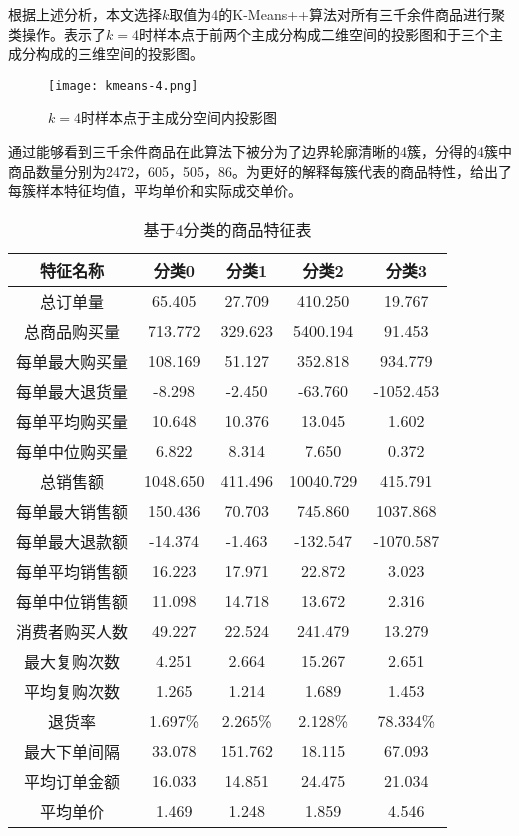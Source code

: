 \documentclass[lang=cn,11pt,a4paper,cite=authoryear]{elegantpaper}
\begin{document}
根据上述分析，本文选择$k$取值为4的K-Means++算法对所有三千余件商品进行聚类操作。表示了$k=4$时样本点于前两个主成分构成二维空间的投影图和于三个主成分构成的三维空间的投影图。
\begin{figure}[H]
  \centering
  \texttt{[image: kmeans-4.png]}
  \caption{$k=4$时样本点于主成分空间内投影图}
  \label{4聚类二维三维图}
\end{figure}

通过能够看到三千余件商品在此算法下被分为了边界轮廓清晰的4簇，分得的4簇中商品数量分别为2472，605，505，86。为更好的解释每簇代表的商品特性，给出了每簇样本特征均值，平均单价和实际成交单价。
\begin{center}
\begin{longtable}{ccccc}
  \caption{基于4分类的商品特征表}
  \label{基于4分类的商品特征表}\\
    \hline
    \textbf{特征名称} & \textbf{分类0} & \textbf{分类1} & \textbf{分类2} & \textbf{分类3}\\
    \hline
    总订单量 & 65.405 & 27.709 & 410.250 & 19.767\\
    总商品购买量 & 713.772 & 329.623 & 5400.194 & 91.453\\
    每单最大购买量 & 108.169 & 51.127 & 352.818 & 934.779\\
    每单最大退货量 & -8.298 & -2.450 & -63.760 & -1052.453\\
    每单平均购买量 & 10.648 & 10.376 & 13.045 & 1.602\\
    每单中位购买量 & 6.822  & 8.314 & 7.650 & 0.372\\
    总销售额 & 1048.650 & 411.496 & 10040.729 & 415.791\\
    每单最大销售额 & 150.436 & 70.703 & 745.860 & 1037.868\\
    每单最大退款额 & -14.374 & -1.463 & -132.547 & -1070.587\\
    每单平均销售额 & 16.223 & 17.971 & 22.872 & 3.023\\
    每单中位销售额 & 11.098 & 14.718 & 13.672 & 2.316\\
    消费者购买人数 & 49.227 & 22.524 & 241.479 & 13.279\\
    最大复购次数 & 4.251 & 2.664 & 15.267 & 2.651\\
    平均复购次数 & 1.265 & 1.214 & 1.689 & 1.453\\
    退货率 & 1.697\% & 2.265\% & 2.128\% & 78.334\%\\
    最大下单间隔 & 33.078 & 151.762 & 18.115 & 67.093\\
    平均订单金额 & 16.033 & 14.851 & 24.475 & 21.034\\
    平均单价 & 1.469 & 1.248 & 1.859 & 4.546\\
    \hline
\end{longtable}
\end{center}
\end{document}
